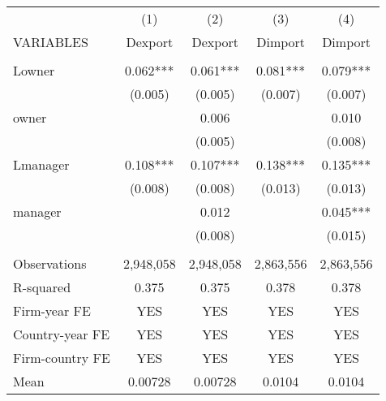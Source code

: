 \begin{tabular}{lcccc} \hline
 & (1) & (2) & (3) & (4) \\
VARIABLES & Dexport & Dexport & Dimport & Dimport \\ \hline
 &  &  &  &  \\
Lowner & 0.062*** & 0.061*** & 0.081*** & 0.079*** \\
 & (0.005) & (0.005) & (0.007) & (0.007) \\
owner &  & 0.006 &  & 0.010 \\
 &  & (0.005) &  & (0.008) \\
Lmanager & 0.108*** & 0.107*** & 0.138*** & 0.135*** \\
 & (0.008) & (0.008) & (0.013) & (0.013) \\
manager &  & 0.012 &  & 0.045*** \\
 &  & (0.008) &  & (0.015) \\
 &  &  &  &  \\
Observations & 2,948,058 & 2,948,058 & 2,863,556 & 2,863,556 \\
R-squared & 0.375 & 0.375 & 0.378 & 0.378 \\
Firm-year FE & YES & YES & YES & YES \\
Country-year FE & YES & YES & YES & YES \\
Firm-country FE & YES & YES & YES & YES \\
 Mean & 0.00728 & 0.00728 & 0.0104 & 0.0104 \\ \hline
\end{tabular}
